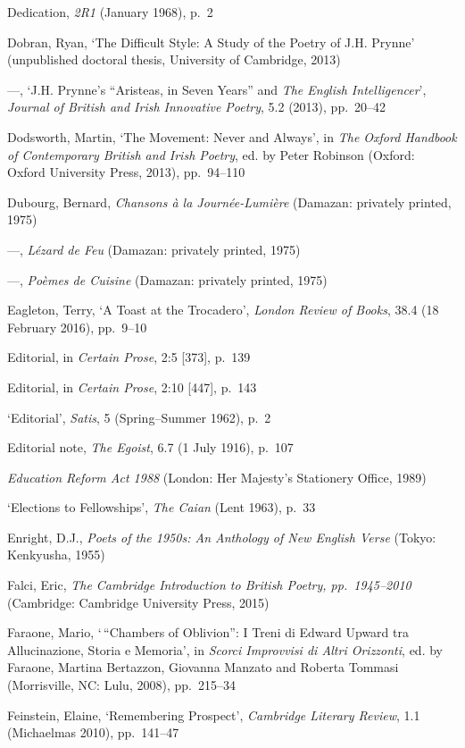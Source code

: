 \documentclass[]{article}
\begin{document}
Dedication, \emph{2R1} (January 1968), p.~2

Dobran, Ryan, `The Difficult Style: A Study of the Poetry of J.H.
Prynne' (unpublished doctoral thesis, University of Cambridge, 2013)

---, `J.H. Prynne's ``Aristeas, in Seven Years'' and \emph{The English
Intelligencer}', \emph{Journal of British and Irish Innovative Poetry},
5.2 (2013), pp.~20--42

Dodsworth, Martin, `The Movement: Never and Always', in \emph{The Oxford
Handbook of Contemporary British and Irish Poetry}, ed. by Peter
Robinson (Oxford: Oxford University Press, 2013), pp.~94--110

Dubourg, Bernard, \emph{Chansons à la Journée-Lumière} (Damazan:
privately printed, 1975)

---, \emph{Lézard de Feu} (Damazan: privately printed, 1975)

---, \emph{Poèmes de Cuisine} (Damazan: privately printed, 1975)

Eagleton, Terry, `A Toast at the Trocadero', \emph{London Review of
Books}, 38.4 (18 February 2016), pp.~9--10

Editorial, in \emph{Certain Prose}, 2:5 {[}373{]}, p.~139

Editorial, in \emph{Certain Prose}, 2:10 {[}447{]}, p.~143

`Editorial', \emph{Satis}, 5 (Spring--Summer 1962), p.~2

Editorial note, \emph{The Egoist}, 6.7 (1 July 1916), p.~107

\emph{Education Reform Act 1988} (London: Her Majesty's Stationery
Office, 1989)

`Elections to Fellowships', \emph{The Caian} (Lent 1963), p.~33

Enright, D.J., \emph{Poets of the 1950s: An Anthology of New English
Verse} (Tokyo: Kenkyusha, 1955)

Falci, Eric, \emph{The Cambridge Introduction to British Poetry,
pp.~1945--2010} (Cambridge: Cambridge University Press, 2015)

Faraone, Mario, `\,``Chambers of Oblivion'': I Treni di Edward Upward
tra Allucinazione, Storia e Memoria', in \emph{Scorci Improvvisi di
Altri Orizzonti}, ed. by Faraone, Martina Bertazzon, Giovanna Manzato
and Roberta Tommasi (Morrisville, NC: Lulu, 2008), pp.~215--34

Feinstein, Elaine, `Remembering Prospect', \emph{Cambridge Literary
Review}, 1.1 (Michaelmas 2010), pp.~141--47
\end{document}
